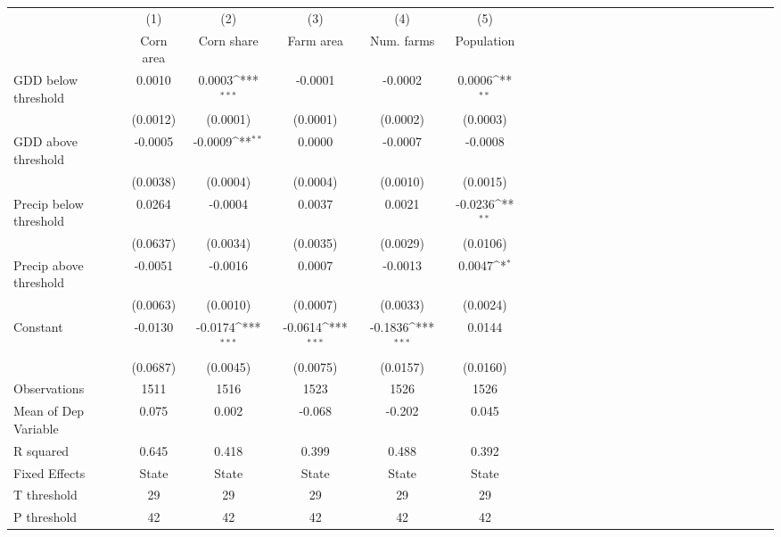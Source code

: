 {
\def\sym#1{\ifmmode^{#1}\else\(^{#1}\)\fi}
\begin{tabular*}{\hsize}{@{\hskip\tabcolsep\extracolsep\fill}l*{5}{ccccc}}
\hline\hline
                &\multicolumn{1}{c}{(1)}&\multicolumn{1}{c}{(2)}&\multicolumn{1}{c}{(3)}&\multicolumn{1}{c}{(4)}&\multicolumn{1}{c}{(5)}\\
                &\multicolumn{1}{c}{Corn area}&\multicolumn{1}{c}{Corn share}&\multicolumn{1}{c}{Farm area}&\multicolumn{1}{c}{Num. farms}&\multicolumn{1}{c}{Population}\\
\hline
GDD below threshold&   0.0010         &   0.0003\sym{***}&  -0.0001         &  -0.0002         &   0.0006\sym{**} \\
                & (0.0012)         & (0.0001)         & (0.0001)         & (0.0002)         & (0.0003)         \\
[1em]
GDD above threshold&  -0.0005         &  -0.0009\sym{**} &   0.0000         &  -0.0007         &  -0.0008         \\
                & (0.0038)         & (0.0004)         & (0.0004)         & (0.0010)         & (0.0015)         \\
[1em]
Precip below threshold&   0.0264         &  -0.0004         &   0.0037         &   0.0021         &  -0.0236\sym{**} \\
                & (0.0637)         & (0.0034)         & (0.0035)         & (0.0029)         & (0.0106)         \\
[1em]
Precip above threshold&  -0.0051         &  -0.0016         &   0.0007         &  -0.0013         &   0.0047\sym{*}  \\
                & (0.0063)         & (0.0010)         & (0.0007)         & (0.0033)         & (0.0024)         \\
[1em]
Constant        &  -0.0130         &  -0.0174\sym{***}&  -0.0614\sym{***}&  -0.1836\sym{***}&   0.0144         \\
                & (0.0687)         & (0.0045)         & (0.0075)         & (0.0157)         & (0.0160)         \\
\hline
Observations    &     1511         &     1516         &     1523         &     1526         &     1526         \\
Mean of Dep Variable&    0.075         &    0.002         &   -0.068         &   -0.202         &    0.045         \\
R squared       &    0.645         &    0.418         &    0.399         &    0.488         &    0.392         \\
Fixed Effects   &    State         &    State         &    State         &    State         &    State         \\
T threshold     &       29         &       29         &       29         &       29         &       29         \\
P threshold     &       42         &       42         &       42         &       42         &       42         \\
\hline\hline
\end{tabular*}
}
